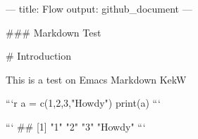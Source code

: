 ---
title: Flow
output: github_document
---


### Markdown Test

# Introduction

This is a test on Emacs Markdown
KekW


```r
a = c(1,2,3,"Howdy")
print(a)
```

```
## [1] "1"     "2"     "3"     "Howdy"
```
